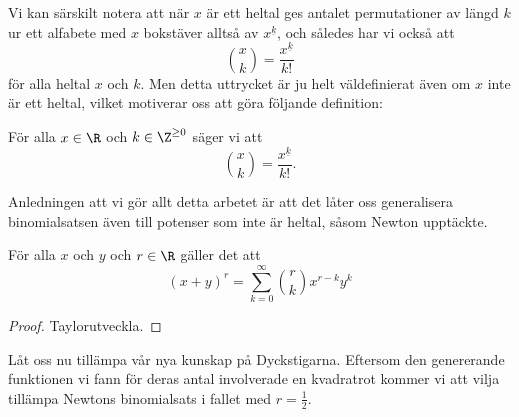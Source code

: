 \documentclass[nobib]{tufte-handout}
\begin{document}
Vi kan särskilt notera att när $x$ är ett heltal ges antalet permutationer av längd $k$ ur ett alfabete med $x$ bokstäver alltså av $x^{\underline{k}}$, och således har vi också att
$$\binom{x}{k} = \frac{x^{\underline{k}}}{k!}$$
för alla heltal $x$ och $k$. Men detta uttrycket är ju helt väldefinierat även om $x$ inte är ett heltal, vilket motiverar oss att göra följande definition:

\begin{definition}
    För alla $x \in \R$ och $k \in \Z^{\geq 0}$ säger vi att
    $$\binom{x}{k} = \frac{x^{\underline{k}}}{k!}.$$
\end{definition}

Anledningen att vi gör allt detta arbetet är att det låter oss generalisera binomialsatsen även till potenser som inte är heltal, såsom Newton upptäckte.

\begin{theorem}
    För alla $x$ och $y$ och $r \in \R$ gäller det att
    $$(x + y)^r = \sum_{k=0}^{\infty} \binom{r}{k} x^{r-k} y^k$$

    \begin{proof}
        Taylorutveckla.
    \end{proof}
\end{theorem}

Låt oss nu tillämpa vår nya kunskap på Dyckstigarna. Eftersom den genererande funktionen vi fann för deras antal involverade en kvadratrot kommer vi att vilja tillämpa Newtons binomialsats i fallet med $r = \frac{1}{2}$.
\end{document}

